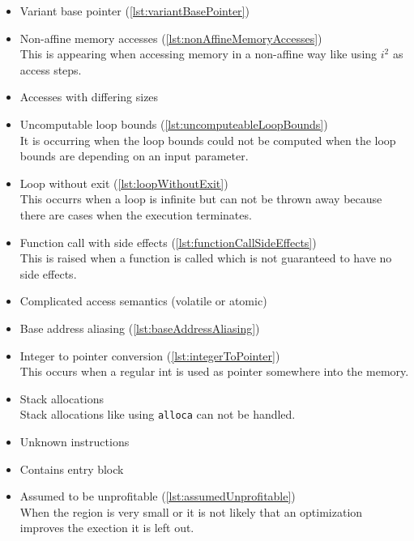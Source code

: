 \begin{itemize}
    \item Variant base pointer (\autoref{lst:variantBasePointer})\\
    \item Non-affine memory accesses (\autoref{lst:nonAffineMemoryAccesses})\\
        This is appearing when accessing memory in a non-affine way like using \(i^2\) as access steps.
    \item Accesses with differing sizes\\
    \item Uncomputable loop bounds (\autoref{lst:uncomputeableLoopBounds})\\
        It is occurring when the loop bounds could not be computed \eg when the loop bounds are depending on an input parameter.
    \item Loop without exit (\autoref{lst:loopWithoutExit})\\
        This occurrs when a loop is infinite but can not be thrown away because there are cases when the execution terminates.
    \item Function call with side effects (\autoref{lst:functionCallSideEffects})\\
        This is raised when a function is called which is not guaranteed to have no side effects.
    \item Complicated access semantics (volatile or atomic)\\
    \item Base address aliasing (\autoref{lst:baseAddressAliasing})\\
    \item Integer to pointer conversion (\autoref{lst:integerToPointer})\\
        This occurs when a regular int is used as pointer somewhere into the memory.
    \item Stack allocations\\
        Stack allocations like using \texttt{alloca} can not be handled.
    \item Unknown instructions\\
    \item Contains entry block\\
    \item Assumed to be unprofitable (\autoref{lst:assumedUnprofitable})\\
        When the region is very small or it is not likely that an optimization improves the exection it is left out.
\end{itemize}

